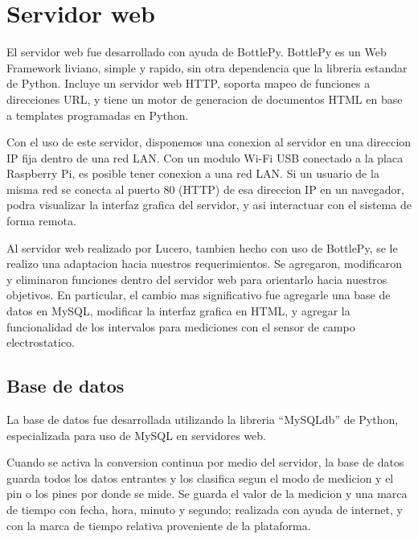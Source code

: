 
\section{Servidor web} %
\label{it7:sec:servidor_web}

El servidor web fue desarrollado con ayuda de BottlePy. BottlePy es un Web Framework liviano, simple y rapido, sin otra dependencia que la libreria estandar de Python. Incluye un servidor web HTTP, soporta mapeo de funciones a direcciones URL, y tiene un motor de generacion de documentos HTML en base a templates programadas en Python.

Con el uso de este servidor, disponemos una conexion al servidor en una direccion IP fija dentro de una red LAN. Con un modulo Wi-Fi USB conectado a la placa Raspberry Pi, es posible tener conexion a una red LAN. Si un usuario de la misma red se conecta al puerto 80 (HTTP) de esa direccion IP en un navegador, podra visualizar la interfaz grafica del servidor, y asi interactuar con el sistema de forma remota.

Al servidor web realizado por Lucero, tambien hecho con uso de BottlePy, se le realizo una adaptacion hacia nuestros requerimientos. Se agregaron, modificaron y eliminaron funciones dentro del servidor web para orientarlo hacia nuestros objetivos. En particular, el cambio mas significativo fue agregarle una base de datos en MySQL, modificar la interfaz grafica en HTML, y agregar la funcionalidad de los intervalos para mediciones con el sensor de campo electrostatico.


\subsection{Base de datos} %
\label{it7:sub:base_de_datos}

La base de datos fue desarrollada utilizando la libreria ``MySQLdb'' de Python, especializada para uso de MySQL en servidores web.

Cuando se activa la conversion continua por medio del servidor, la base de datos guarda todos los datos entrantes y los clasifica segun el modo de medicion y el pin o los pines por donde se mide. Se guarda el valor de la medicion y una marca de tiempo con fecha, hora, minuto y segundo; realizada con ayuda de internet, y con la marca de tiempo relativa proveniente de la plataforma.

